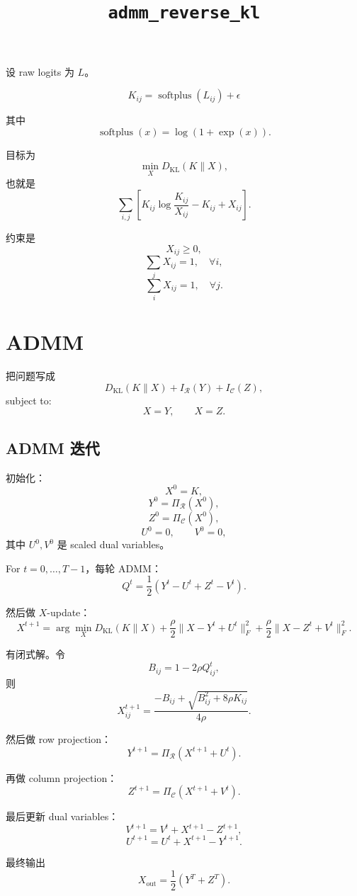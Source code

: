 \documentclass[UTF8]{ctexart}
\title{\texttt{admm\_reverse\_kl}}
\author{}
\date{}
\begin{document}
\maketitle

设 raw logits 为 $L$。

\[
K_{ij} = \operatorname{softplus}(L_{ij}) + \epsilon
\]

其中
\[
\operatorname{softplus}(x)=\log(1+\exp(x)).
\]

目标为
\[
\min_X D_{\mathrm{KL}}(K \| X),
\]
也就是
\[
\sum_{i,j}
\left[
K_{ij}\log\frac{K_{ij}}{X_{ij}}
-
K_{ij}
+
X_{ij}
\right].
\]

约束是
\[
X_{ij}\ge 0,
\]
\[
\sum_j X_{ij}=1,\quad \forall i,
\]
\[
\sum_i X_{ij}=1,\quad \forall j.
\]

\section*{ADMM}

把问题写成
\[
D_{\mathrm{KL}}(K \| X)
+
I_{\mathcal{R}}(Y)
+
I_{\mathcal{C}}(Z),
\]
subject to:
\[
X=Y,\qquad X=Z.
\]

\subsection*{ADMM 迭代}

初始化：
\[
X^0=K,
\]
\[
Y^0=\Pi_{\mathcal{R}}(X^0),
\]
\[
Z^0=\Pi_{\mathcal{C}}(X^0),
\]
\[
U^0=0,\qquad V^0=0,
\]
其中 $U^0,V^0$ 是 scaled dual variables。

For $t=0,\ldots,T-1$，每轮 ADMM：
\[
Q^t=\frac{1}{2}(Y^t-U^t+Z^t-V^t).
\]

然后做 $X$-update：
\[
X^{t+1}
=
\arg\min_X
D_{\mathrm{KL}}(K \| X)
+
\frac{\rho}{2}\|X-Y^t+U^t\|_F^2
+
\frac{\rho}{2}\|X-Z^t+V^t\|_F^2.
\]

有闭式解。令
\[
B_{ij}=1-2\rho Q^t_{ij},
\]
则
\[
X^{t+1}_{ij}
=
\frac{
-B_{ij}
+
\sqrt{B_{ij}^2+8\rho K_{ij}}
}
{4\rho}.
\]

然后做 row projection：
\[
Y^{t+1}
=
\Pi_{\mathcal{R}}(X^{t+1}+U^t).
\]

再做 column projection：
\[
Z^{t+1}
=
\Pi_{\mathcal{C}}(X^{t+1}+V^t).
\]

最后更新 dual variables：
\[
V^{t+1}=V^t+X^{t+1}-Z^{t+1},
\]
\[
U^{t+1}=U^t+X^{t+1}-Y^{t+1}.
\]

最终输出
\[
X_{\mathrm{out}}
=
\frac{1}{2}(Y^T+Z^T).
\]
\end{document}
